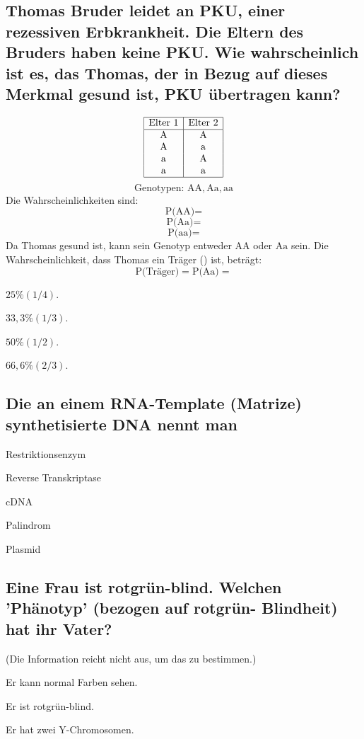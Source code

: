 \documentclass{article}
\begin{document}
\subsection*{Thomas Bruder leidet an PKU, einer rezessiven Erbkrankheit. Die Eltern
des Bruders haben keine PKU. Wie wahrscheinlich ist es, das Thomas,
der in Bezug auf dieses Merkmal gesund ist, PKU übertragen kann?}
\[
\begin{array}{|c|c|}
\hline
\text{Elter 1} & \text{Elter 2} \\
\hline
\text{A} & \text{A} \\
\text{A} & \text{a} \\
\text{a} & \text{A} \\
\text{a} & \text{a} \\
\hline
\end{array}
\]
\[
\text{Genotypen: } \text{AA}, \text{Aa}, \text{aa}
\]
Die Wahrscheinlichkeiten sind:
\[
\text{P(AA)} = 
\]
\[
\text{P(Aa)} = 
\]
\[
\text{P(aa)} = 
\]
Da Thomas gesund ist, kann sein Genotyp entweder \( \text{AA} \) oder \( \text{Aa} \) sein. Die Wahrscheinlichkeit, dass Thomas ein Träger () ist, beträgt:
\[
\text{P(Träger)} = \text{P(Aa)} =  
\]
\begin{todolist} %
\item $25 \% (1/4).$
\item $33,3 \% (1/3).$
\item  $50 \% (1/2).$
\item $66,6 \% (2/3).$
\end{todolist}
\subsection*{Die an einem RNA-Template (Matrize) synthetisierte DNA nennt man}
\begin{todolist}%
\item Restriktionsenzym  
\item Reverse Transkriptase  
\item  cDNA
\item Palindrom  
\item Plasmid  
\end{todolist}
\subsection*{Eine Frau ist rotgrün-blind. Welchen 'Phänotyp' (bezogen auf rotgrün-
Blindheit) hat ihr Vater?}
\begin{todolist}%
\item (Die Information reicht nicht aus, um das zu bestimmen.)
\item Er kann normal Farben sehen. 
\item  Er ist rotgrün-blind.  
\item Er hat zwei Y-Chromosomen.
\end{todolist}
\end{document}
